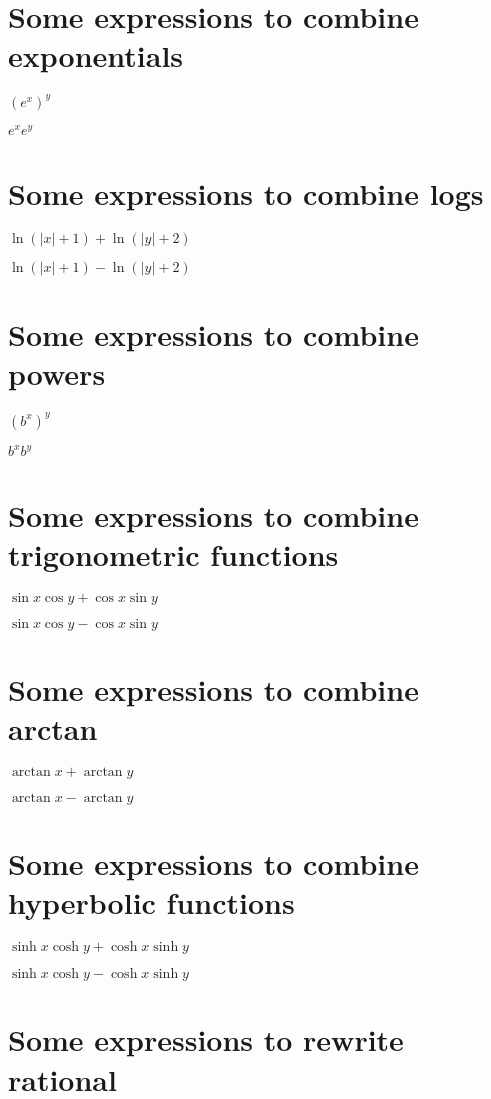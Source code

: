 \documentclass{article}
\begin{document}
\section{Some expressions to combine exponentials}

$\left( e^{x}\right) ^{y}$

$e^{x}e^{y}$

\section{Some expressions to combine logs}

$\ln \left( \left\vert x\right\vert +1\right) +\ln \left( \left\vert
y\right\vert +2\right) $

$\ln \left( \left\vert x\right\vert +1\right) -\ln \left( \left\vert
y\right\vert +2\right) $

\section{Some expressions to combine powers}

$\left( b^{x}\right) ^{y}$

$b^{x}b^{y}$

\section{Some expressions to combine trigonometric functions}

$\sin x\cos y+\cos x\sin y$

$\sin x\cos y-\cos x\sin y$

\section{Some expressions to combine arctan}

$\arctan x+\arctan y$

$\arctan x-\arctan y$

\section{Some expressions to combine hyperbolic functions}

$\sinh x\cosh y+\cosh x\sinh y$

$\sinh x\cosh y-\cosh x\sinh y$

\hrulefill

\section{Some expressions to rewrite rational}
\end{document}
